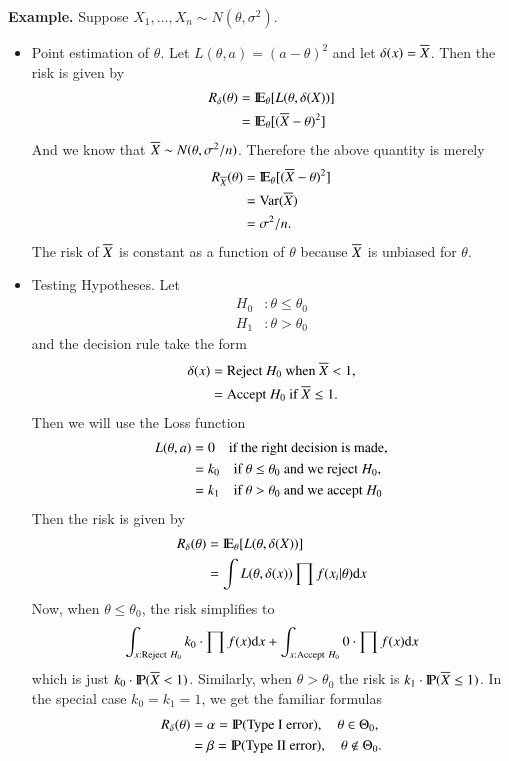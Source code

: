 \documentclass[11pt,english]{scrbook}
\begin{document}
\textbf{Example.} Suppose \(X_{1},\ldots,X_{n}\sim N(\theta,\sigma^{2})\).
\begin{itemize}
\item Point estimation of \(\theta\). Let \(L(\theta,a)=(a-\theta)^{2}\) and let \(\delta(x)=\Xbar\). Then the risk is given by 
\begin{align*}
R_{\delta}(\theta) & =\E_{\theta}[L(\theta,\delta(X))]\\
& =\E_{\theta}[(\Xbar-\theta)^{2}]
\end{align*}
And we know that \(\Xbar\sim N(\theta,\sigma^{2}/n)\). Therefore the above quantity is merely 
\begin{align*}
R_{\Xbar}(\theta) & =\E_{\theta}[(\Xbar-\theta)^{2}]\\
& =\mathrm{Var}(\Xbar)\\
& =\sigma^{2}/n.
\end{align*}
The risk of \(\Xbar\) is constant as a function of \(\theta\) because \(\Xbar\) is unbiased for \(\theta\).

\item Testing Hypotheses. Let 
\begin{align*}
H_{0} & :\theta \leq \theta_{0}\\
H_{1} & :\theta > \theta_{0}
\end{align*}
and the decision rule take the form 
  \begin{align*}
  \delta(x) & =\mbox{Reject \ensuremath{H_{0}} when \ensuremath{\Xbar<1},}\\
& =\mbox{Accept \ensuremath{H_{0}} if \ensuremath{\Xbar\leq1}.}
  \end{align*}
Then we will use the Loss function 
  \begin{align*}
  L(\theta,a) & =0\quad\mbox{if the right decision is made,}\\
& =k_{0}\quad\mbox{if \ensuremath{\theta\leq\theta_{0}} and we reject \ensuremath{H_{0}},}\\
& =k_{1}\quad\mbox{if \ensuremath{\theta>\theta_{0}} and we accept \ensuremath{H_{0}}}
  \end{align*}
Then the risk is given by 
\begin{align*}
R_{\delta}(\theta) & =\E_{\theta}[L(\theta,\delta(X))]\\
& =\int L(\theta,\delta(x))\prod f(x_{i}|\theta)\diff x
\end{align*}
Now, when \(\theta \leq \theta_{0}\), the risk simplifies to 
\[
   \int_{x:\mathrm{Reject}\ H_{0}}k_{0}\cdot\prod f(x)\diff x+\int_{x:\mathrm{Accept}\ H_{0}}0\cdot\prod f(x)\diff x
   \]
which is just \(k_{0}\cdot\P(\Xbar<1)\). Similarly, when \(\theta>\theta_{0}\) the risk is \newline \(k_{1}\cdot\P(\Xbar\leq1)\). In the special case \(k_{0}=k_{1}=1\), we get the familiar formulas 
  \begin{align*}
  R_{\delta}(\theta) & =\alpha=\P(\mbox{Type I error}),\quad\theta\in\Theta_{0},\\
& =\beta=\P(\mbox{Type II error}),\quad\theta\notin\Theta_{0}.
  \end{align*}
\end{itemize}
\end{document}
